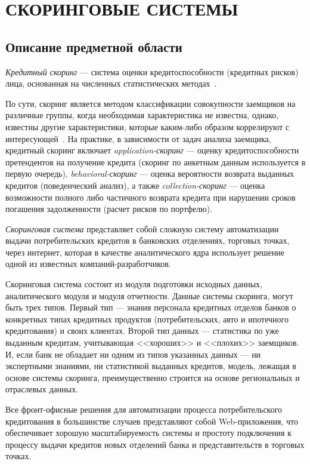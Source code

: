 \section[Скоринговые системы]{СКОРИНГОВЫЕ СИСТЕМЫ}

\subsection{Описание предметной области}

\emph{Кредитный скоринг} --- система оценки кредитоспособности (кредитных рисков) лица,
основанная на численных статистических методах~\cite{wiki_credit_score}.

По сути, скоринг является методом классификации совокупности заемщиков на различные группы,
когда необходимая характеристика не известна, однако, известны другие характеристики,
которые каким-либо образом коррелируют с интересующей~\cite{rumyantsev2006}.
На практике, в зависимости от задач анализа заемщика, кредитный скоринг включает
\emph{application-скоринг} --- оценку кредитоспособности претендентов на получение кредита
(скоринг по анкетным данным используется в первую очередь),
\emph{behavioral-скоринг} --- оценка вероятности возврата выданных кредитов
(поведенческий анализ), а также
\emph{collection-скоринг} --- оценка возможности полного либо частичного возврата кредита
при нарушении сроков погашения задолженности (расчет рисков по портфелю).

\emph{Скоринговая система} представляет собой сложную систему автоматизации
выдачи потребительских кредитов в банковских отделениях, торговых точках, через интернет,
которая в качестве аналитического ядра использует решение одной из известных компаний-разработчиков.

Скоринговая система состоит из модуля подготовки исходных данных,
аналитического модуля и модуля отчетности.
Данные системы скоринга, могут быть трех типов.
Первый тип --- знания персонала кредитных отделов банков о конкретных типах кредитных
продуктов (потребительских, авто и ипотечного кредитования) и своих клиентах.
Второй тип данных --- статистика по уже выданным кредитам, учитывающая <<хороших>>
и <<плохих>> заемщиков. И, если банк не обладает ни одним из типов указанных данных ---
ни экспертными знаниями, ни статистикой выданных кредитов, модель,
лежащая в основе системы скоринга, преимущественно строится на основе региональных и отраслевых данных.

Все фронт-офисные решения для автоматизации процесса потребительского кредитования в большинстве случаев
представляют собой Web-приложения, что обеспечивает хорошую масштабируемость системы и
простоту подключения к процессу выдачи кредитов новых отделений банка и представительств в торговых точках.

